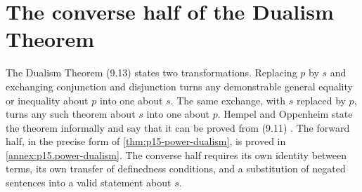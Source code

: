 \section{The converse half of the Dualism Theorem}
\label{sec:p15-w02c-p15-029-dualism}

The Dualism Theorem (9.13) states two transformations. Replacing
\(p\) by \(s\) and exchanging conjunction and disjunction turns any
demonstrable general equality or inequality about \(p\) into one about
\(s\). The same exchange, with \(s\) replaced by \(p\), turns any such
theorem about \(s\) into one about \(p\). Hempel and Oppenheim state the
theorem informally and say that it can be proved from (9.11)
\cite[pp.~172--173]{HempelOppenheim1948Explanation}. The forward half,
in the precise form of \cref{thm:p15-power-dualism}, is proved in
\cref{annex:p15.power-dualism}. The converse half requires its own
identity between terms, its own transfer of definedness conditions, and
a substitution of negated sentences into a valid statement about \(s\).

